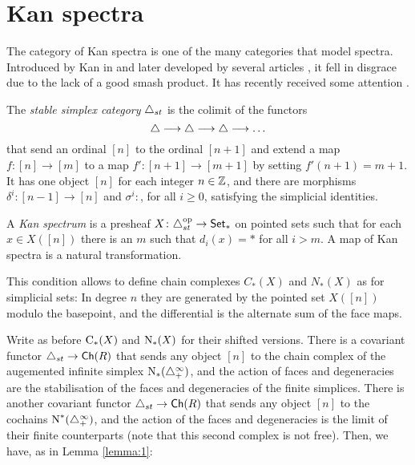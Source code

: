 
\section{Kan spectra}\label{s:9Kanspectra}

The category of Kan spectra is one of the many categories that model spectra. Introduced by Kan in \cite{Kan1963} and later developed by several articles \cite{burghelea_kanspectraI1967, burghelea_kanspectraII_1968, burghelea_kanspectraIII1969,Brown1973}, it fell in disgrace due to the lack of a good smash product. It has recently received some attention \cite{Stephan2015, CKP2023}.

\begin{definition}
    The \emph{stable simplex category} $\triangle_{st}$ is the colimit of the functors
    \[
        \triangle\longrightarrow \triangle\longrightarrow \triangle\longrightarrow \ldots
    \]
    that send an ordinal $[n]$ to the ordinal $[n+1]$ and extend a map $f\colon [n]\to [m]$ to a map $f'\colon [n+1]\to [m+1]$ by setting $f'(n+1) = m+1$. It has one object $[n]$ for each integer $n\in \mathbb{Z}$, and there are morphisms $\delta^i\colon [n-1]\to [n]$ and $\sigma^i\colon $, for all $i\geq 0$, satisfying the simplicial identities.
\end{definition}
\begin{definition}
    A \emph{Kan spectrum} is a presheaf $X\colon \triangle_{st}^{{\mathrm{op}}}\to \mathsf{Set}_*$ on pointed sets such that for each $x\in X([n])$ there is an $m$ such that $d_i(x) = *$ for all $i>m$. A map of Kan spectra is a natural transformation.
\end{definition}

This condition allows to define chain complexes $C_*(X)$ and $N_*(X)$ as for simplicial sets: In degree $n$ they are generated by the pointed set $X([n])$ modulo the basepoint, and the differential is the alternate sum of the face maps.

Write as before $\operatorname{C}_*(X)$ and $\operatorname{N}_*(X)$ for their shifted versions. There is a covariant functor $\triangle_{st}\to \mathsf{Ch}(R)$ that sends any object $[n]$ to the chain complex of the augemented infinite simplex $\operatorname{N}_*(\triangle_{+}^\infty)$, and the action of faces and degeneracies are the stabilisation of the faces and degeneracies of the finite simplices. There is another covariant functor $\triangle_{st}\to \mathsf{Ch}(R)$ that sends any object $[n]$ to the cochains $\operatorname{N}^*(\triangle_{+}^\infty)$, and the action of the faces and degeneracies is the limit of their finite counterparts (note that this second complex is not free). Then, we have, as in Lemma \ref{lemma:1}:

